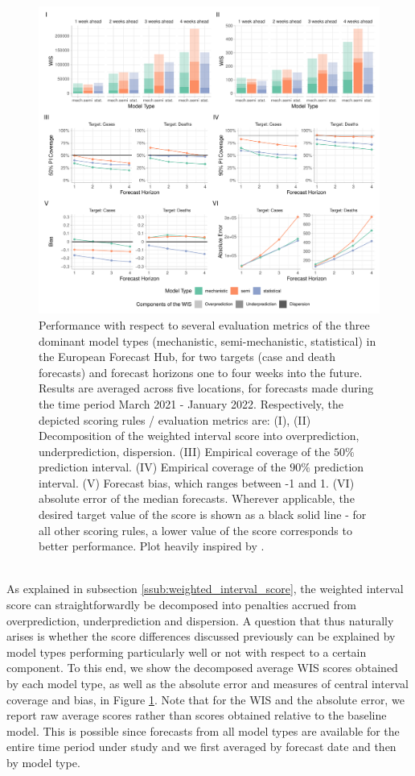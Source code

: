 \begin{figure}
\centering
\includegraphics[width = \textwidth]{../plots/overall_assessment_model_types.pdf}
\caption{Performance with respect to several evaluation metrics of the three dominant model types (mechanistic, semi-mechanistic, statistical) in the European Forecast Hub, for two targets (case and death forecasts) and forecast horizons one to four weeks into the future. Results are averaged across five locations, for forecasts made during the time period March 2021 - January 2022. Respectively, the depicted scoring rules / evaluation metrics are: (I), (II) Decomposition of the weighted interval score into overprediction, underprediction, dispersion. (III) Empirical coverage of the $50\%$ prediction interval. (IV) Empirical coverage of the $90\%$ prediction interval. (V) Forecast bias, which ranges between -1 and 1. (VI) absolute error of the median forecasts. Wherever applicable, the desired target value of the score is shown as a black solid line - for all other scoring rules, a lower value of the score corresponds to better performance. Plot heavily inspired by \cite{bosse_comparing_2021-1}.}
\label{fig:decomp_model_types}
\end{figure}\medskip\\ 
\noindent As explained in subsection \ref{ssub:weighted_interval_score}, the weighted interval score can straightforwardly be decomposed into penalties accrued from overprediction, underprediction and dispersion. A question that thus naturally arises is whether the score differences discussed previously can be explained by model types performing particularly well or not with respect to a certain component. To this end, we show the decomposed average WIS scores obtained by each model type, as well as the absolute error and measures of central interval coverage and bias, in Figure \ref{fig:decomp_model_types}. Note that for the WIS and the absolute error, we report raw average scores rather than scores obtained relative to the baseline model. This is possible since forecasts from all model types are available for the entire time period under study and we first averaged by forecast date and then by model type.\\ 
